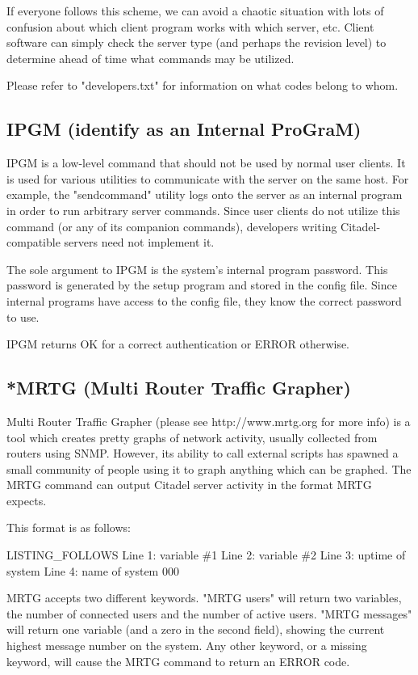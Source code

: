  If everyone follows this scheme, we can avoid a chaotic situation with lots
of confusion about which client program works with which server, etc.  Client
software can simply check the server type (and perhaps the revision level)
to determine ahead of time what commands may be utilized.

 Please refer to "developers.txt" for information on what codes belong to whom.



\subsection{IPGM (identify as an Internal ProGraM)}

 IPGM is a low-level command that should not be used by normal user clients.
It is used for various utilities to communicate with the server on the same
host.  For example, the "sendcommand" utility logs onto the server as an
internal program in order to run arbitrary server commands.  Since user clients
do not utilize this command (or any of its companion commands), developers
writing Citadel-compatible servers need not implement it.

 The sole argument to IPGM is the system's internal program password.  This
password is generated by the setup program and stored in the config file.
Since internal programs have access to the config file, they know the correct
password to use.

 IPGM returns OK for a correct authentication or ERROR otherwise.



\subsection{*MRTG (Multi Router Traffic Grapher)}

 Multi Router Traffic Grapher (please see http://www.mrtg.org for more info) is
a tool which creates pretty graphs of network activity, usually collected from
routers using SNMP.  However, its ability to call external scripts has spawned
a small community of people using it to graph anything which can be graphed.
The MRTG command can output Citadel server activity in the format MRTG expects.

 This format is as follows:

 LISTING_FOLLOWS
 Line 1: variable \#1
 Line 2: variable \#2
 Line 3: uptime of system
 Line 4: name of system
 000

 MRTG accepts two different keywords.  "MRTG users" will return two variables,
the number of connected users and the number of active users.  "MRTG messages"
will return one variable (and a zero in the second field), showing the current
highest message number on the system.  Any other keyword, or a missing keyword,
will cause the MRTG command to return an ERROR code.

